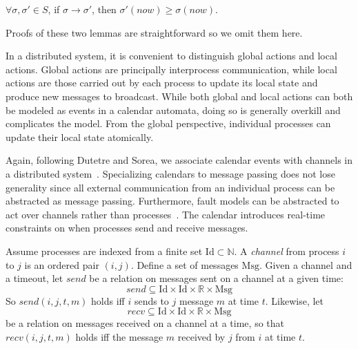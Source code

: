 \documentclass{llncs/llncs}
\newcommand{\Id}{\ensuremath{\mathrm{Id}}\xspace}
\newcommand{\Msg}{\ensuremath{\mathrm{Msg}}\xspace}
\begin{document}
\begin{lemma}
$\forall \sigma, \sigma' \in S$, if $\sigma \rightarrow \sigma'$, then $\sigma'(now) \geq \sigma(now)$.
\end{lemma}

Proofs of these two lemmas are straightforward so we omit them here.

In a distributed system, it is convenient to distinguish global actions and local actions. Global actions are principally interprocess communication, while local actions are those carried out by each process to update its local state and produce new messages to broadcast. While both global and local actions can both be modeled as events in a calendar automata, doing so is generally overkill and complicates the model. From the global perspective, individual processes can update their local state atomically.

Again, following Dutetre and Sorea, we associate calendar events with channels in a distributed system~\cite{cal}. Specializing calendars to message passing does not lose generality since all external communication from an individual process can be abstracted as message passing. Furthermore, fault models can be abstracted to act over channels rather than processes~\cite{abstractions}. The calendar introduces real-time constraints on when processes send and receive messages.

Assume processes are indexed from a finite set $\Id \subset \mathbb{N}$. A \emph{channel} from process $i$ to $j$ is an ordered pair $(i,j)$. Define a set of messages $\Msg$. Given a channel and a timeout, let $send$ be a relation on messages sent on a channel at a given time:
$$send \subseteq \Id \times \Id \times \mathbb{R} \times \Msg$$
So $send(i, j, t, m)$ holds iff $i$ sends to $j$ message $m$ at time $t$. Likewise, let
$$recv \subseteq \Id \times \Id \times \mathbb{R} \times \Msg$$
be a relation on messages received on a channel at a time, so that $recv(i, j, t, m)$ holds iff the message $m$ received by $j$ from $i$ at time $t$.
\end{document}
